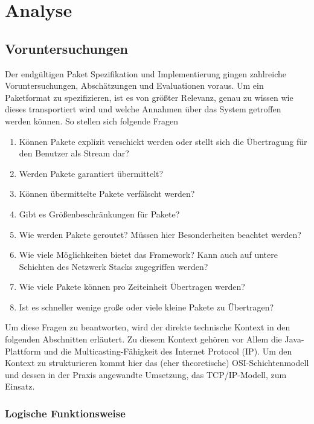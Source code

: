 \chapter{Analyse}

\section{Voruntersuchungen}

Der endgültigen Paket Spezifikation und Implementierung gingen zahlreiche Voruntersuchungen, Abschätzungen und Evaluationen voraus.
Um ein Paketformat zu spezifizieren, ist es von größter Relevanz, genau zu wissen wie dieses transportiert wird und welche Annahmen über das System getroffen werden können. So stellen sich folgende Fragen

\begin{enumerate}
\item Können Pakete explizit verschickt werden oder stellt sich die Übertragung für den Benutzer als Stream dar?
\item Werden Pakete garantiert übermittelt?
\item Können übermittelte Pakete verfälscht werden?
\item Gibt es Größenbeschränkungen für Pakete?
\item Wie werden Pakete geroutet? Müssen hier Besonderheiten beachtet werden?
\item Wie viele Möglichkeiten bietet das Framework? Kann auch auf untere Schichten des Netzwerk Stacks zugegriffen werden?
\item Wie viele Pakete können pro Zeiteinheit Übertragen werden?
\item Ist es schneller wenige große oder viele kleine Pakete zu Übertragen?
\end{enumerate}

Um diese Fragen zu beantworten, wird der direkte technische Kontext in den folgenden Abschnitten erläutert.
Zu diesem Kontext gehören vor Allem die Java-Plattform
und die Multicasting-Fähigkeit des Internet Protocol (IP). Um den Kontext zu
strukturieren kommt hier das (eher theoretische) OSI-Schichtenmodell und dessen
in der Praxis angewandte Umsetzung, das TCP/IP-Modell, zum Einsatz.

\subsection{Logische Funktionsweise}

